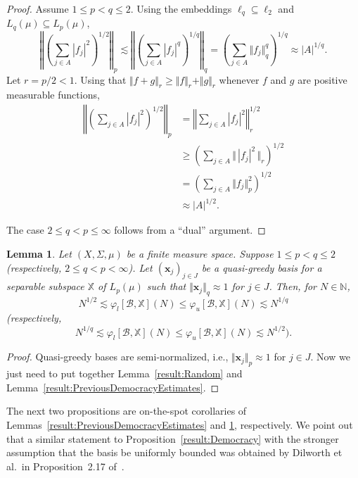 \documentclass[11pt, leqno]{amsart}
\newtheorem{lemma}[theorem]{Lemma}
\theoremstyle{remark}
\numberwithin{equation}{section}
\newcommand{\NN}{\ensuremath{\mathbb{N}}}
\newcommand{\XX}{\ensuremath{\mathbb{X}}}
\newcommand{\xx}{\ensuremath{\mathbf{x}}}
\newcommand{\BB}{\mathcal{B}}
\begin{document}
\begin{proof}
Assume $1\le p<q\le 2$. Using the embeddings $\ell_q\subseteq\ell_2$ and $L_q(\mu)\subseteq L_p(\mu)$,
\begin{equation*}
\left\Vert \left(\sum_{j\in A} | f_j|^2\right)^{1/2}\right\Vert_p
\lesssim \left\Vert \left(\sum_{j\in A} | f_j|^q\right)^{1/q}\right\Vert_q
=\left(\sum_{j\in A} \Vert f_j\Vert_q^q\right)^{1/q}
\approx |A|^{1/q}.
\end{equation*}
Let $r=p/2<1$. Using that $\Vert f+g\Vert_r \ge \Vert f\Vert_r +\Vert g\Vert_r$ whenever $f$ and $g$ are positive measurable  functions,
\begin{align*}
 \left\Vert \left(\sum_{j\in A} | f_j|^2\right)^{1/2}\right\Vert_p
&= \left\Vert \sum_{j\in A} | f_j|^2\right\Vert_r^{1/2}\\
&\ge \left( \sum_{j\in A} \Vert \,  |f_j|^2 \, \Vert_r \right)^{1/2}\\
&=\left( \sum_{j\in A} \Vert f_j \Vert_p^2 \right)^{1/2}\\
&\approx |A|^{1/2}.
\end{align*}

The case $2\le q<p\le\infty$ follows from a ``dual'' argument.
\end{proof}

\begin{lemma}
\label{result:DemocracyEstimates}
Let $(X,\Sigma,\mu)$ be a finite measure space. Suppose $1\le p< q\le 2$ (respectively, $2\le q <p<\infty$). Let  $(\xx_j)_{j\in J}$ be a quasi-greedy basis for
a separable subspace $\XX$ of $L_p(\mu)$ such that $\Vert \xx_j \Vert_q\approx 1$ for $j\in J$. Then, for $N\in\NN$,
\[
N^{1/2} \lesssim \varphi_{l}[\BB,\XX](N) \le \varphi_{u}[\BB,\XX](N) \lesssim N^{1/q}
\]
(respectively,
\[
N^{1/q} \lesssim \varphi_{l}[\BB,\XX](N) \le \varphi_{u}[\BB,\XX](N) \lesssim N^{1/2}).
\]
\end{lemma}

\begin{proof} 
Quasi-greedy bases are semi-normalized, i.e., $\Vert \xx_j \Vert_p\approx 1$ for $j \in J$. 
Now we just need to put together Lemma~\ref{result:Random} and Lemma~\ref{result:PreviousDemocracyEstimates}.
\end{proof}


The next two propositions are on-the-spot corollaries of Lemmas~\ref{result:PreviousDemocracyEstimates} and \ref{result:DemocracyEstimates}, respectively. We point out that a similar statement to Proposition~\ref{result:Democracy} with the stronger assumption that the basis be uniformly bounded was obtained by Dilworth et al.\ in Proposition~2.17 of~\cite{DST2012}.
\end{document}
